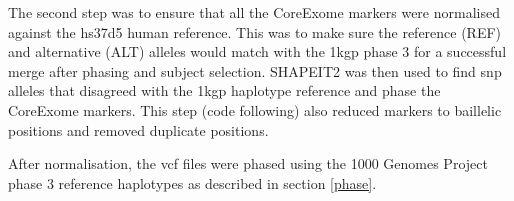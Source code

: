 \documentclass[]{report}
\newenvironment{Shaded}{\begin{snugshade}}{\end{snugshade}}
\newcommand{\StringTok}[1]{\textcolor[rgb]{0.31,0.60,0.02}{#1}}
\newcommand{\FunctionTok}[1]{\textcolor[rgb]{0.00,0.00,0.00}{#1}}
\newcommand{\VariableTok}[1]{\textcolor[rgb]{0.00,0.00,0.00}{#1}}
\newcommand{\ExtensionTok}[1]{#1}
\newcommand{\NormalTok}[1]{#1}
\begin{document}
\begin{Shaded}
\end{Shaded}

The second step was to ensure that all the CoreExome markers were
normalised against the hs37d5 human reference. This was to make sure the
reference (REF) and alternative (ALT) alleles would match with the
\gls{1kgp} phase 3 for a successful merge after phasing and subject
selection. SHAPEIT2 was then used to find \gls{snp} alleles that
disagreed with the \gls{1kgp} haplotype reference and phase the
CoreExome markers. This step (code following) also reduced markers to
baillelic positions and removed duplicate positions.

\begin{Shaded}
\end{Shaded}

After normalisation, the \gls{vcf} files were phased using the 1000
Genomes Project phase 3 reference haplotypes as described in section
\ref{phase}.
\end{document}
